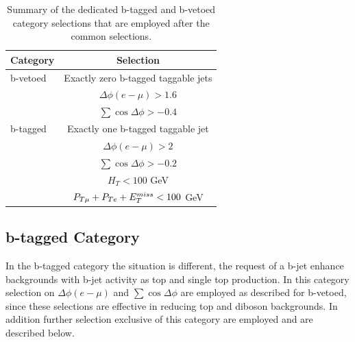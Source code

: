 \begin{table}[t]
  \begin{center}
    \begin{tabular}{p{4cm}c}
      \hline \hline
      Category & Selection \\ [3pt]
      \hline
      b-vetoed & Exactly zero b-tagged taggable jets \\	
      & $\Delta\phi(e-\mu)>1.6$ \\
      & $\sum\cos\Delta\phi > -0.4$ \\[5pt]
      \hline
      b-tagged & Exactly one b-tagged taggable jet \\
      & $\Delta\phi(e-\mu)>2$ \\
      & $\sum\cos\Delta\phi > -0.2$ \\
      & $ H_T < 100$ GeV \\
      & $P_{T\mu} + P_{Te} + E_{T}^{miss} < 100$ GeV \\[3pt]
      \hline \hline
    \end{tabular}
    \caption{Summary of the dedicated b-tagged and b-vetoed category selections that are employed after the common selections.}
    \label{tab:sel}
  \end{center}
\end{table}

\subsection{b-tagged Category}\label{sec:tag}
In the b-tagged category the situation is different, 
the  request of a b-jet enhance backgrounds with b-jet activity as top and single top production.
In this category selection on $\Delta\phi(e-\mu)$ and $\sum\cos\Delta\phi$  are employed as described for b-vetoed,
since these selections are effective in reducing top and diboson backgrounds. In addition further selection exclusive of this category
are employed  and are described below.

